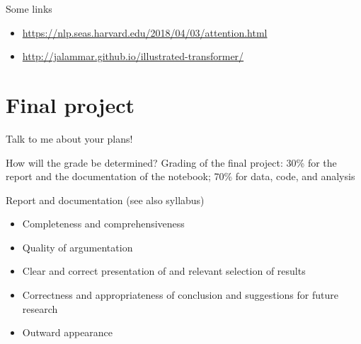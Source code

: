 \begin{frame}{Some links}
\begin{itemize}
\item \url{https://nlp.seas.harvard.edu/2018/04/03/attention.html}
\item \url{http://jalammar.github.io/illustrated-transformer/}
\end{itemize}
\end{frame}


\section{Final project}

\begin{frame}[standout]
Talk to me about your plans!
\end{frame}

\begin{frame}{How will the grade be determined?}
Grading of the final project: 30\% for the report and the documentation of the notebook; 70\% for data, code, and analysis

\pause

\begin{block}{Report and documentation}
(see also syllabus)
\footnotesize
\begin{itemize}
\item Completeness and comprehensiveness
\item Quality of argumentation
\item Clear and correct presentation of and relevant selection of results
\item Correctness and appropriateness of conclusion and suggestions for future research
\item Outward appearance
\end{itemize}
\end{block}

\end{frame}



